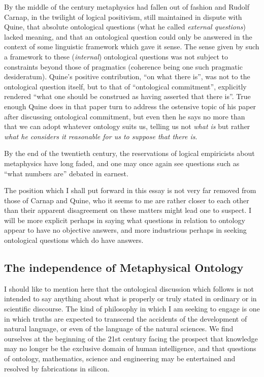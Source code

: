 \documentclass{rbjk}
\begin{document}
\begin{article}
By the middle of the century metaphysics had fallen out of fashion and Rudolf Carnap, in the twilight of logical positivism, still maintained in dispute with Quine, that absolute ontological questions (what he called {\it external questions}) lacked meaning, and that an ontological question could only be answered in the context of some linguistic framework which gave it sense.
The sense given by such a framework to these ({\it internal}) ontological questions was not subject to constraints beyond those of pragmatics (coherence being one such pragmatic desideratum). 
Quine's positive contribution, ``on what there is'', was not to the ontological question itself, but to that of ``ontological commitment'', explicitly rendered ``what one should be construed as having asserted that there is''.
True enough Quine does in that paper turn to address the ostensive topic of his paper after discussing ontological commitment, but even then he says no more than that we can adopt whatever ontology suits us, telling us not {\it what is} but rather {\it what he considers it reasonable for us to suppose that there is}.

By the end of the twentieth century, the reservations of logical empiricists about metaphysics have long faded, and one may once again see questions such as ``what numbers are'' debated in earnest.

The position which I shall put forward in this essay is not very far removed from those of Carnap and Quine, who it seems to me are rather closer to each other than their apparent disagreement on these matters might lead one to suspect.
I will be more explicit perhaps in saying what questions in relation to ontology appear to have no objective answers, and more industrious perhaps in seeking ontological questions which do have answers.

\subsection{The independence of Metaphysical Ontology}

I should like to mention here that the ontological discussion which follows is not intended to say anything about what is properly or truly stated in ordinary or in scientific discourse.
The kind of philosophy in which I am seeking to engage is one in which truths are expected to transcend the accidents of the development of natural language, or even of the language of the natural sciences.
We find ourselves at the beginning of the 21st century facing the prospect that knowledge may no longer be the exclusive domain of human intelligence, and that questions of ontology, mathematics, science and engineering may be entertained and resolved by fabrications in silicon.


\end{article}
\end{document}
